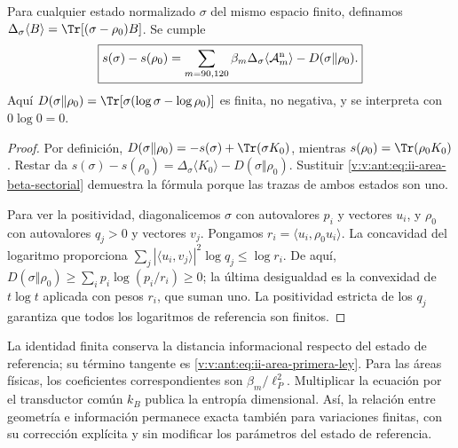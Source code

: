 \begin{theorem}
\label{v:v:ant:thm:ii-area-ley-finita}
Para cualquier estado normalizado \(\sigma\) del mismo espacio finito,
definamos \(\Delta_\sigma\langle B\rangle
=\Tr[(\sigma-\rho_0)B]\). Se cumple
\begin{equation}
 \boxed{
 s(\sigma)-s(\rho_0)
 =\sum_{m=90,120}\beta_m
      \Delta_\sigma\langle\mathcal A_m^{\rm n}\rangle
   -D(\sigma\Vert\rho_0).}
 \label{v:v:ant:eq:ii-area-ley-finita}
\end{equation}
Aquí \(D(\sigma\Vert\rho_0)=\Tr[\sigma(\log\sigma-\log\rho_0)]\)
es finita, no negativa, y se interpreta con \(0\log0=0\).
\end{theorem}
\begin{proof}
Por definición,
\(D(\sigma\Vert\rho_0)=-s(\sigma)+\Tr(\sigma K_0)\), mientras
\(s(\rho_0)=\Tr(\rho_0K_0)\). Restar da
\(s(\sigma)-s(\rho_0)=\Delta_\sigma\langle K_0\rangle
-D(\sigma\Vert\rho_0)\). Sustituir
\eqref{v:v:ant:eq:ii-area-beta-sectorial} demuestra la fórmula porque las
trazas de ambos estados son uno.

Para ver la positividad, diagonalicemos \(\sigma\) con autovalores
\(p_i\) y vectores \(u_i\), y \(\rho_0\) con autovalores
\(q_j>0\) y vectores \(v_j\). Pongamos
\(r_i=\langle u_i,\rho_0u_i\rangle\). La concavidad del logaritmo
proporciona
\(\sum_j|\langle u_i,v_j\rangle|^2\log q_j\le\log r_i\).
De aquí,
\(D(\sigma\Vert\rho_0)\ge\sum_i p_i\log(p_i/r_i)\ge0\);
la última desigualdad es la convexidad de \(t\log t\) aplicada
con pesos \(r_i\), que suman uno. La positividad estricta de los
\(q_j\) garantiza que todos los logaritmos de referencia son finitos.
\end{proof}

La identidad finita conserva la distancia informacional respecto del
estado de referencia; su término tangente es
\eqref{v:v:ant:eq:ii-area-primera-ley}. Para las áreas físicas, los
coeficientes correspondientes son \(\beta_m/\ell_P^2\).
Multiplicar la ecuación por el transductor común \(k_B\) publica
la entropía dimensional. Así, la relación entre geometría e información
permanece exacta también para variaciones finitas, con su corrección
explícita y sin modificar los parámetros del estado de referencia.
